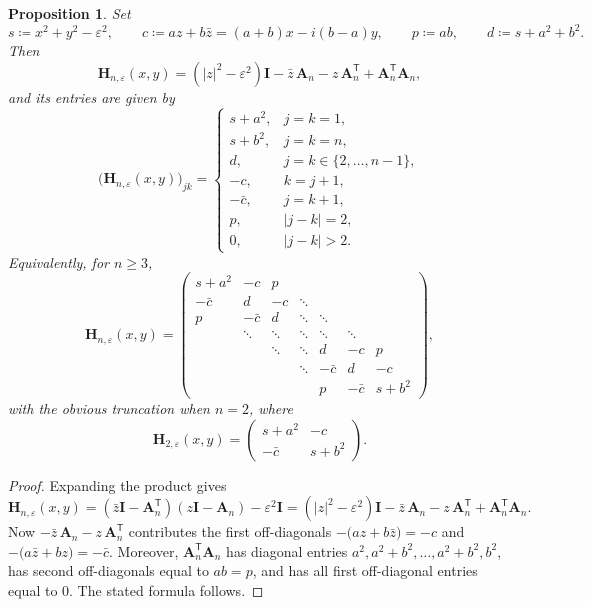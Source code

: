 \documentclass[11pt]{article}
\newtheorem{proposition}[theorem]{Proposition}
\begin{document}
\begin{proposition}\label{prop:explicit-H}
Set
\[
s\coloneqq x^2+y^2-\varepsilon^2,
\qquad
c\coloneqq az+b\bar z=(a+b)x-i(b-a)y,
\qquad
p\coloneqq ab,
\qquad
d\coloneqq s+a^2+b^2.
\]
Then
\[
\mathbf{H}_{n,\varepsilon}(x,y)
=(|z|^2-\varepsilon^2)\mathbf{I}-\bar z\,\mathbf{A}_n-z\,\mathbf{A}_n^{\mathsf{T}}+\mathbf{A}_n^{\mathsf{T}}\mathbf{A}_n,
\]
and its entries are given by
\[
\bigl(\mathbf{H}_{n,\varepsilon}(x,y)\bigr)_{jk}
=
\begin{cases}
s+a^2, & j=k=1,\\
s+b^2, & j=k=n,\\
d, & j=k\in\{2,\dots,n-1\},\\
-c, & k=j+1,\\
-\bar c, & j=k+1,\\
p, & |j-k|=2,\\
0, & |j-k|>2.
\end{cases}
\]
Equivalently, for $n\ge 3$,
\[
\mathbf{H}_{n,\varepsilon}(x,y)=
\begin{pmatrix}
s+a^2 & -c & p \\
-\bar c & d & -c & \ddots \\
p & -\bar c & d & \ddots & \ddots \\
& \ddots & \ddots & \ddots & \ddots & \ddots \\
&& \ddots & \ddots & d & -c & p \\
&&& \ddots & -\bar c & d & -c \\
&&&& p & -\bar c & s+b^2
\end{pmatrix},
\]
with the obvious truncation when $n=2$, where
\[
\mathbf{H}_{2,\varepsilon}(x,y)=
\begin{pmatrix}
s+a^2 & -c \\
-\bar c & s+b^2
\end{pmatrix}.
\]
\end{proposition}

\begin{proof}
Expanding the product gives
\[
\mathbf{H}_{n,\varepsilon}(x,y)
=(\bar z\mathbf{I}-\mathbf{A}_n^{\mathsf{T}})(z\mathbf{I}-\mathbf{A}_n)-\varepsilon^2\mathbf{I}
=(|z|^2-\varepsilon^2)\mathbf{I}-\bar z\,\mathbf{A}_n-z\,\mathbf{A}_n^{\mathsf{T}}+\mathbf{A}_n^{\mathsf{T}}\mathbf{A}_n.
\]
Now $-\bar z\,\mathbf{A}_n-z\,\mathbf{A}_n^{\mathsf{T}}$ contributes the first off-diagonals
$-\bigl(az+b\bar z\bigr)=-c$ and $-\bigl(a\bar z+bz\bigr)=-\bar c$.
Moreover, $\mathbf{A}_n^{\mathsf{T}}\mathbf{A}_n$ has diagonal entries
$a^2,a^2+b^2,\dots,a^2+b^2,b^2$, has second off-diagonals equal to $ab=p$,
and has all first off-diagonal entries equal to $0$. The stated formula follows.
\end{proof}
\end{document}
